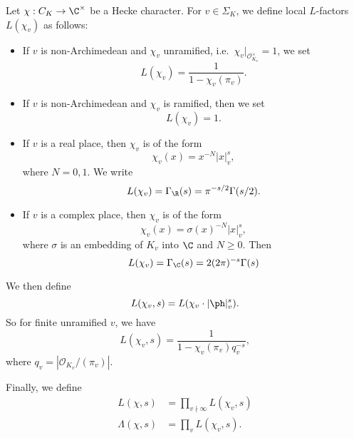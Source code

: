 \documentclass[a4paper]{article}
\begin{document}
\begin{defi}
  Let $\chi: C_K \to \C^\times$ be a Hecke character. For $v \in \Sigma_K$, we define local $L$-factors $L(\chi_v)$ as follows:
  \begin{itemize}
    \item If $v$ is non-Archimedean and $\chi_v$ unramified, i.e.\ $\chi_v|_{\mathcal{O}_{K_v}^\times} = 1$, we set
      \[
        L(\chi_v) = \frac{1}{1 - \chi_v(\pi_v)}.
      \]
    \item If $v$ is non-Archimedean and $\chi_v$ is ramified, then we set
      \[
        L(\chi_v) = 1.
      \]
    \item If $v$ is a real place, then $\chi_v$ is of the form
      \[
        \chi_v(x) = x^{-N} |x|_v^s,
      \]
      where $N = 0, 1$. We write
      \[
        L(\chi_v) = \Gamma_\R(s) = \pi^{-s/2} \Gamma(s/2).
      \]
    \item If $v$ is a complex place, then $\chi_v$ is of the form
      \[
        \chi_v(x) = \sigma(x)^{-N} |x|_v^s,
      \]
      where $\sigma$ is an embedding of $K_v$ into $\C$ and $N \geq 0$. Then
      \[
        L(\chi_v) = \Gamma_\C(s) = 2 (2\pi)^{-s} \Gamma(s)
      \]
  \end{itemize}
  We then define
  \[
    L(\chi_v, s) = L(\chi_v \cdot |\ph|_v^s).
  \]
  So for finite unramified $v$, we have
  \[
    L(\chi_v, s) = \frac{1}{1 - \chi_v(\pi_v) q_v^{-s}},
  \]
  where $q_v = |\mathcal{O}_{K_v}/(\pi_v)|$.

  Finally, we define
  \begin{align*}
    L(\chi, s) &= \prod_{v \nmid \infty} L(\chi_v, s)\\
    \Lambda(\chi, s) &= \prod_v L(\chi_v, s).
  \end{align*}
\end{defi}
\end{document}
